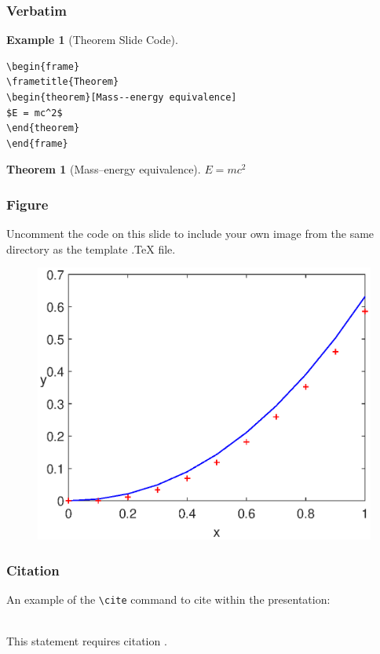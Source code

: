 \documentclass[compress]{beamer}
\numberwithin{figure}{section}
\numberwithin{table}{section}
\numberwithin{equation}{section}
\newtheorem{thm}{Theorem}
\numberwithin{thm}{section}
\numberwithin{defn}{section}
\numberwithin{lmm}{section}
\theoremstyle{example}
\newtheorem{exam}{Example}
\numberwithin{figure}{section}
\numberwithin{table}{section}
\numberwithin{equation}{section}
\begin{document}


\begin{frame}[fragile] %
\frametitle{Verbatim}
\begin{exam}[Theorem Slide Code]
\begin{verbatim}
\begin{frame}
\frametitle{Theorem}
\begin{theorem}[Mass--energy equivalence]
$E = mc^2$
\end{theorem}
\end{frame}\end{verbatim}
\end{exam}

\begin{thm}[Mass--energy equivalence]
$E = mc^2$
\end{thm}
\end{frame}


\begin{frame}
\frametitle{Figure}

Uncomment the code on this slide to include your own image from the same directory as the template .TeX file.
\begin{figure}
\includegraphics[width=0.8\linewidth]{Image.eps}
\end{figure}
\end{frame}


\begin{frame}[fragile] %
\frametitle{Citation}
An example of the \verb|\cite| command to cite within the presentation:\\~

This statement requires citation \cite{p1}.
\end{frame}
\end{document}
